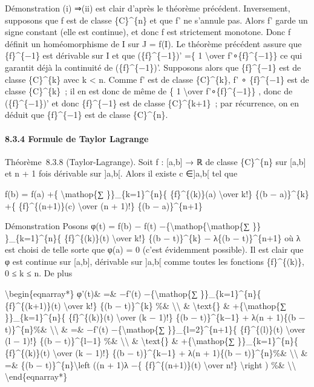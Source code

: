 \documentclass[]{article}
\begin{document}
Démonstration (i) ⇒(ii) est clair d'après le théorème précédent.
Inversement, supposons que f est de classe \{C\}\^{}\{n\} et que f' ne
s'annule pas. Alors f' garde un signe constant (elle est continue), et
donc f est strictement monotone. Donc f définit un homéomorphisme de I
sur J = f(I). Le théorème précédent assure que \{f\}\^{}\{−1\} est
dérivable sur I et que (\{f\}\^{}\{−1\})' =\{ 1 \textbackslash{}over
f'∘\{f\}\^{}\{−1\}\} ce qui garantit déjà la continuité de
(\{f\}\^{}\{−1\})'. Supposons alors que \{f\}\^{}\{−1\} est de classe
\{C\}\^{}\{k\} avec k \textless{} n. Comme f' est de classe
\{C\}\^{}\{k\}, f' ∘ \{f\}\^{}\{−1\} est de classe \{C\}\^{}\{k\}~; il
en est donc de même de \{ 1 \textbackslash{}over f'∘\{f\}\^{}\{−1\}\} ,
donc de (\{f\}\^{}\{−1\})' et donc \{f\}\^{}\{−1\} est de classe
\{C\}\^{}\{k+1\}~; par récurrence, on en déduit que \{f\}\^{}\{−1\} est
de classe \{C\}\^{}\{n\}.

\paragraph{8.3.4 Formule de Taylor Lagrange}

Théorème~8.3.8 (Taylor-Lagrange). Soit f : {[}a,b{]} → ℝ de classe
\{C\}\^{}\{n\} sur {[}a,b{]} et n + 1 fois dérivable sur {]}a,b{[}.
Alors il existe c ∈{]}a,b{[} tel que

f(b) = f(a) +\{ \textbackslash{}mathop\{∑ \}\}\_\{k=1\}\^{}\{n\}\{
\{f\}\^{}\{(k)\}(a) \textbackslash{}over k!\} \{(b − a)\}\^{}\{k\} +\{
\{f\}\^{}\{(n+1)\}(c) \textbackslash{}over (n + 1)!\} \{(b −
a)\}\^{}\{n+1\}

Démonstration Posons φ(t) = f(b) − f(t)
−\{\textbackslash{}mathop\{\textbackslash{}mathop\{∑ \}\}
\}\_\{k=1\}\^{}\{n\}\{ \{f\}\^{}\{(k)\}(t) \textbackslash{}over k!\}
\{(b − t)\}\^{}\{k\} − λ\{(b − t)\}\^{}\{n+1\} où λ est choisi de telle
sorte que φ(a) = 0 (c'est évidemment possible). Il est clair que φ est
continue sur {[}a,b{]}, dérivable sur {]}a,b{[} comme toutes les
fonctions \{f\}\^{}\{(k)\}, 0 ≤ k ≤ n. De plus

\textbackslash{}begin\{eqnarray*\} φ'(t)\& =\& −f'(t)
−\{\textbackslash{}mathop\{∑ \}\}\_\{k=1\}\^{}\{n\}\{
\{f\}\^{}\{(k+1)\}(t) \textbackslash{}over k!\} \{(b − t)\}\^{}\{k\}
\%\& \textbackslash{}\textbackslash{} \& \textbackslash{}text\{\} \&
+\{\textbackslash{}mathop\{∑ \}\}\_\{k=1\}\^{}\{n\}\{
\{f\}\^{}\{(k)\}(t) \textbackslash{}over (k − 1)!\} \{(b −
t)\}\^{}\{k−1\} + λ(n + 1)\{(b − t)\}\^{}\{n\}\%\&
\textbackslash{}\textbackslash{} \& =\& −f'(t)
−\{\textbackslash{}mathop\{∑ \}\}\_\{l=2\}\^{}\{n+1\}\{
\{f\}\^{}\{(l)\}(t) \textbackslash{}over (l − 1)!\} \{(b −
t)\}\^{}\{l−1\} \%\& \textbackslash{}\textbackslash{} \&
\textbackslash{}text\{\} \& +\{\textbackslash{}mathop\{∑
\}\}\_\{k=1\}\^{}\{n\}\{ \{f\}\^{}\{(k)\}(t) \textbackslash{}over (k −
1)!\} \{(b − t)\}\^{}\{k−1\} + λ(n + 1)\{(b − t)\}\^{}\{n\}\%\&
\textbackslash{}\textbackslash{} \& =\& \{(b −
t)\}\^{}\{n\}\textbackslash{}left ((n + 1)λ −\{ \{f\}\^{}\{(n+1)\}(t)
\textbackslash{}over n!\} \textbackslash{}right ) \%\&
\textbackslash{}\textbackslash{} \textbackslash{}end\{eqnarray*\}
\end{document}
